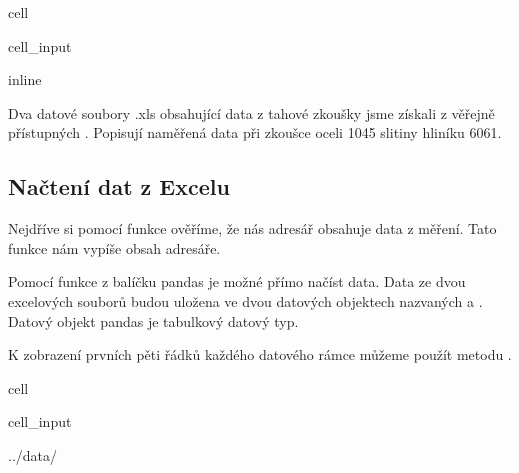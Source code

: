 \documentclass[letterpaper,10pt,english]{jupyterBook}
\begin{document}
{{\begin{sphinxuseclass}{cell}
\begin{sphinxVerbatimInput}
\begin{sphinxuseclass}{cell_input}
\begin{sphinxVerbatim}[commandchars=\\\{\}]
   
   
   
   
 inline
\end{sphinxVerbatim}

\end{sphinxuseclass}\end{sphinxVerbatimInput}

\end{sphinxuseclass}
\sphinxAtStartPar
Dva datové soubory .xls obsahující data z tahové zkoušky jsme získali z věřejně přístupných . Popisují naměřená data při zkoušce oceli 1045 slitiny hliníku 6061.


\subsection{Načtení dat z Excelu}
\label{\detokenize{Prednasky/2_7_P_u0159_xedklad _tahov_xe9_zkou_u0161ky:nacteni-dat-z-excelu}}
\sphinxAtStartPar
Nejdříve si pomocí funkce  ověříme, že nás adresář obsahuje data z měření. Tato funkce nám vypíše obsah adresáře.

\sphinxAtStartPar
Pomocí funkce  z balíčku pandas je možné přímo načíst data. Data ze dvou excelových souborů budou uložena ve dvou datových objektech nazvaných  a . Datový objekt pandas je tabulkový datový typ.

\sphinxAtStartPar
K zobrazení prvních pěti řádků každého datového rámce můžeme použít metodu .

\begin{sphinxuseclass}{cell}\begin{sphinxVerbatimInput}

\begin{sphinxuseclass}{cell_input}
\begin{sphinxVerbatim}[commandchars=\\\{\}]
 ../data/ 
  
\end{sphinxVerbatim}


\end{sphinxuseclass}
\end{sphinxVerbatimInput}
\end{sphinxuseclass}}}
\end{document}
